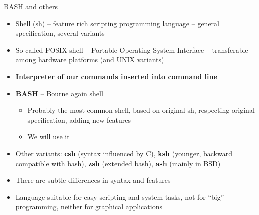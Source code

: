 \documentclass[compress, ucs, xelatex, 11pt, xcolor=svgnames,
  hyperref={
    bookmarks=true,
    unicode=true,
    colorlinks=true,
    pdftitle={Linux, command line and MetaCentrum},
    plainpages=false,
    pdfauthor={Vojtech Zeisek},
    pdfsubject={Course about use of Linux command line, writing shell scripts and using MetaCentrum of CESNET},
    pdfcreator={XeLaTeX},
    pdfkeywords={Linux, GNU, BASH, shell, command line, MetaCentrum},
    linkcolor=DarkRed,
    anchorcolor=DarkBlue,
    citecolor=Indigo,
    filecolor=NavyBlue,
    menucolor=DarkMagenta,
    urlcolor=DarkBlue,
    pdftex},
  url={hyphens, lowtilde} %
  ]{beamer}
\begin{document}
\begin{frame}{BASH and others}
\begin{itemize}
  \item Shell (sh) -- feature rich scripting programming language -- general specification, several variants
  \item So called POSIX shell -- Portable Operating System Interface -- transferable among hardware platforms (and UNIX variants)
  \item \textbf{Interpreter of our commands inserted into command line}
  \item \textbf{BASH} -- Bourne again shell
  \begin{itemize}
    \item Probably the most common shell, based on original sh, respecting original specification, adding new features
    \item We will use it
  \end{itemize}
  \item Other variants: \textbf{csh} (syntax influenced by C), \textbf{ksh} (younger, backward compatible with bash), \textbf{zsh} (extended bash), \textbf{ash} (mainly in BSD)
  \item There are subtle differences in syntax and features
  \item Language suitable for easy scripting and system tasks, not for ``big'' programming, neither for graphical applications
\end{itemize}
\end{frame}
\end{document}
